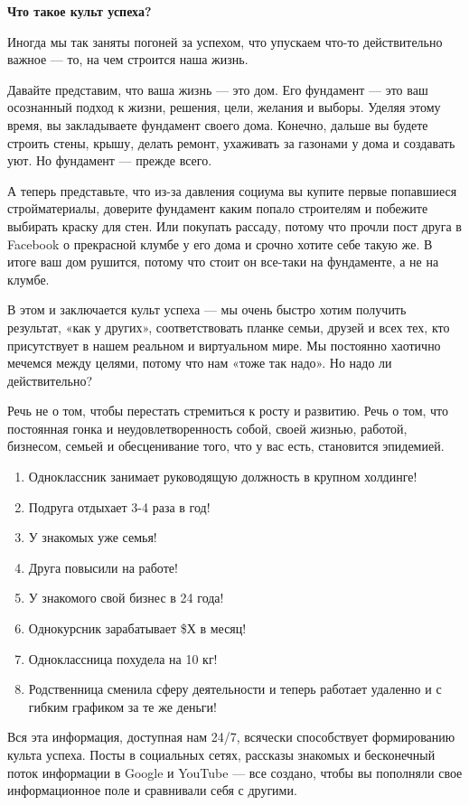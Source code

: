 \textbf{Что такое культ успеха?}

Иногда мы так заняты погоней за успехом, что упускаем что-то действительно важное — то, на чем строится наша жизнь.

Давайте представим, что ваша жизнь — это дом. Его фундамент — это ваш осознанный подход к жизни, решения, цели, желания и выборы. Уделяя этому время, вы закладываете фундамент своего дома. Конечно, дальше вы будете строить стены, крышу, делать ремонт, ухаживать за газонами у дома и создавать уют. Но фундамент — прежде всего.

А теперь представьте, что из-за давления социума вы купите первые попавшиеся стройматериалы, доверите фундамент каким попало строителям и побежите выбирать краску для стен. Или покупать рассаду, потому что прочли пост друга в Facebook о прекрасной клумбе у его дома и срочно хотите себе такую же. В итоге ваш дом рушится, потому что стоит он все-таки на фундаменте, а не на клумбе.

В этом и заключается культ успеха — мы очень быстро хотим получить результат, «как у других», соответствовать планке семьи, друзей и всех тех, кто присутствует в нашем реальном и виртуальном мире. Мы постоянно хаотично мечемся между целями, потому что нам «тоже так надо». Но надо ли действительно?

Речь не о том, чтобы перестать стремиться к росту и развитию. Речь о том, что постоянная гонка и неудовлетворенность собой, своей жизнью, работой, бизнесом, семьей и обесценивание того, что у вас есть, становится эпидемией.

\begin{enumerate}
    \item Одноклассник занимает руководящую должность в крупном холдинге!
    \item Подруга отдыхает 3-4 раза в год!
    \item У знакомых уже семья!
    \item Друга повысили на работе!
    \item У знакомого свой бизнес в 24 года!
    \item Однокурсник зарабатывает \$Х в месяц!
    \item Одноклассница похудела на 10 кг!
    \item Родственница сменила сферу деятельности и теперь работает удаленно и с гибким графиком за те же деньги!
\end{enumerate}

Вся эта информация, доступная нам 24/7, всячески способствует формированию культа успеха. Посты в социальных сетях, рассказы знакомых и бесконечный поток информации в Google и YouTube — все создано, чтобы вы пополняли свое информационное поле и сравнивали себя с другими.

